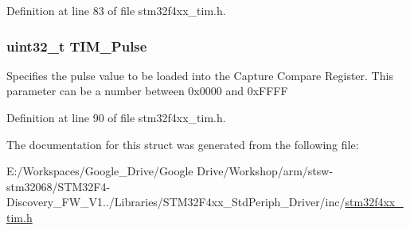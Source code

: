 Definition at line 83 of file stm32f4xx\-\_\-tim.\-h.

\hypertarget{struct_t_i_m___o_c_init_type_def_afd7020848ac0ad264aa3c4687f3c3ec4}{
\subsubsection[{T\-I\-M\-\_\-\-Pulse}]{\setlength{\rightskip}{0pt plus 5cm}uint32\-\_\-t T\-I\-M\-\_\-\-Pulse}}\label{struct_t_i_m___o_c_init_type_def_afd7020848ac0ad264aa3c4687f3c3ec4}
Specifies the pulse value to be loaded into the Capture Compare Register. This parameter can be a number between 0x0000 and 0x\-F\-F\-F\-F 

Definition at line 90 of file stm32f4xx\-\_\-tim.\-h.



The documentation for this struct was generated from the following file\-:\begin{DoxyCompactItemize}
\item 
E\-:/\-Workspaces/\-Google\-\_\-\-Drive/\-Google Drive/\-Workshop/arm/stsw-\/stm32068/\-S\-T\-M32\-F4-\/\-Discovery\-\_\-\-F\-W\-\_\-\-V1../\-Libraries/\-S\-T\-M32\-F4xx\-\_\-\-Std\-Periph\-\_\-\-Driver/inc/\hyperlink{stm32f4xx__tim_8h}{stm32f4xx\-\_\-tim.\-h}\end{DoxyCompactItemize}
